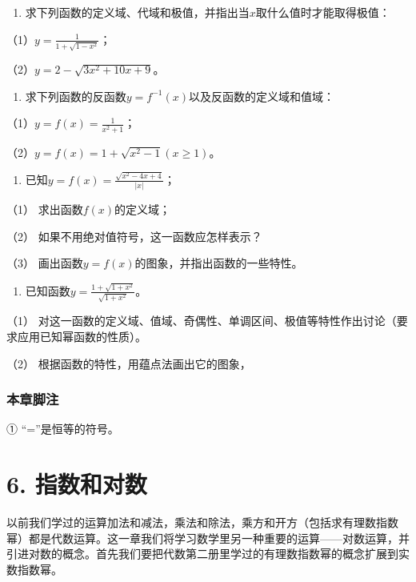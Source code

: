 \begin{enumerate}[start=2]
\item
  求下列函数的定义域、代域和极值，并指出当\(x\)取什么值时才能取得极值：
\end{enumerate}

（1）\(y = \frac{1}{1 + \sqrt{1 - x^2}}\)；

（2）\(y = 2 - \sqrt{3x^2 + 10x + 9}\)。

\begin{enumerate}[start=3]
\item
  求下列函数的反函数\(y = f^{-1}(x)\)以及反函数的定义域和值域：
\end{enumerate}

（1）\(y = f(x) = \frac{1}{x^2 + 1}\)；

（2）\(y = f(x) = 1 + \sqrt{x^2 - 1} (x \geqslant 1)\)。

\begin{enumerate}[start=4]
\item
  已知\(y = f(x) = \frac{\sqrt{x^2 - 4x + 4}}{|x|}\)；
\end{enumerate}

（1） 求出函数\(f(x)\)的定义域；

（2） 如果不用绝对值符号，这一函数应怎样表示？

（3） 画出函数\(y = f(x)\)的图象，并指出函数的一些特性。

\begin{enumerate}[start=5]
\item
  已知函数\(y = \frac{1 + \sqrt{1 + x^2}}{\sqrt{1 + x^2}}\)。
\end{enumerate}

（1）
对这一函数的定义域、值域、奇偶性、单调区间、极值等特性作出讨论（要求应用已知幂函数的性质）。

（2） 根据函数的特性，用蕴点法画出它的图象，

\subsection{本章脚注}

① ``=''是恒等的符号。

\chapter{6. 指数和对数}

以前我们学过的运算加法和减法，乘法和除法，乘方和开方（包括求有理数指数幂）都是代数运算。这一章我们将学习数学里另一种重要的运算------对数运算，并引进对数的概念。首先我们要把代数第二册里学过的有理数指数幂的概念扩展到实数指数幂。

